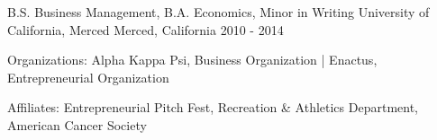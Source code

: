 


\begin{cventriesedu}


\cventry
{B.S. Business Management, B.A. Economics, Minor in Writing} %
{University of California, Merced} %
{Merced, California} %
{2010 - 2014} %
{ %
\begin{cvitems}
\item {Organizations: Alpha Kappa Psi, Business Organization | Enactus, Entrepreneurial Organization}
\item {Affiliates: Entrepreneurial Pitch Fest, Recreation \& Athletics Department, American Cancer Society}
\end{cvitems}
}


\end{cventriesedu}